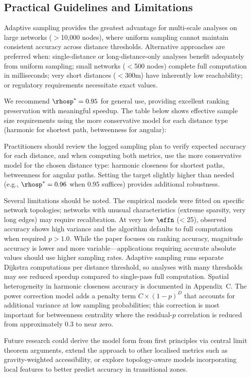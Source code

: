\label{sec:discussion}

\subsection{Practical Guidelines and Limitations}

Adaptive sampling provides the greatest advantage for multi-scale analyses on large networks ($>$10,000 nodes), where uniform sampling cannot maintain consistent accuracy across distance thresholds. Alternative approaches are preferred when: single-distance or long-distance-only analyses benefit adequately from uniform sampling; small networks ($<$500 nodes) complete full computation in milliseconds; very short distances ($<$300m) have inherently low reachability; or regulatory requirements necessitate exact values.

We recommend $\rhosp^* = 0.95$ for general use, providing excellent ranking preservation with meaningful speedup. The table below shows effective sample size requirements using the more conservative model for each distance type (harmonic for shortest path, betweenness for angular):

\begin{center}

\end{center}

Practitioners should review the logged sampling plan to verify expected accuracy for each distance, and when computing both metrics, use the more conservative model for the chosen distance type: harmonic closeness for shortest paths, betweenness for angular paths. Setting the target slightly higher than needed (e.g., $\rhosp^* = 0.96$ when 0.95 suffices) provides additional robustness.

Several limitations should be noted. The empirical models were fitted on specific network topologies; networks with unusual characteristics (extreme sparsity, very long edges) may require recalibration. At very low $\effn$ (< 25), observed accuracy shows high variance and the algorithm defaults to full computation when required $p > 1.0$. While the paper focuses on ranking accuracy, magnitude accuracy is lower and more variable---applications requiring accurate absolute values should use higher sampling rates. Adaptive sampling runs separate Dijkstra computations per distance threshold, so analyses with many thresholds may see reduced speedup compared to single-pass full computation. Spatial heterogeneity in harmonic closeness accuracy is documented in Appendix~C. The power correction model adds a penalty term $C \times (1-p)^D$ that accounts for additional variance at low sampling probabilities; this correction is most important for betweenness centrality where the residual-$p$ correlation is reduced from approximately 0.3 to near zero.

Future research could derive the model form from first principles via central limit theorem arguments, extend the approach to other localised metrics such as gravity-weighted accessibility, or explore topology-aware models incorporating local features to better predict accuracy in transitional zones.
